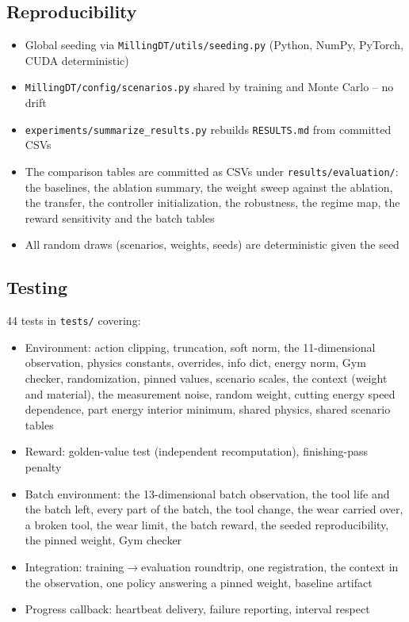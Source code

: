 \documentclass[11pt,a4paper]{article}
\begin{document}
\subsection{Reproducibility}
\begin{itemize}
    \item Global seeding via \texttt{MillingDT/utils/seeding.py} (Python, NumPy, PyTorch, CUDA deterministic)
    \item \texttt{MillingDT/config/scenarios.py} shared by training and Monte Carlo -- no drift
    \item \texttt{experiments/summarize\_results.py} rebuilds \texttt{RESULTS.md} from committed CSVs
    \item The comparison tables are committed as CSVs under \texttt{results/evaluation/}: the baselines, the ablation summary, the weight sweep against the ablation, the transfer, the controller initialization, the robustness, the regime map, the reward sensitivity and the batch tables
    \item All random draws (scenarios, weights, seeds) are deterministic given the seed
\end{itemize}

\subsection{Testing}
44 tests in \texttt{tests/} covering:
\begin{itemize}
    \item Environment: action clipping, truncation, soft norm, the 11-dimensional observation, physics constants, overrides, info dict, energy norm, Gym checker, randomization, pinned values, scenario scales, the context (weight and material), the measurement noise, random weight, cutting energy speed dependence, part energy interior minimum, shared physics, shared scenario tables
    \item Reward: golden-value test (independent recomputation), finishing-pass penalty
    \item Batch environment: the 13-dimensional batch observation, the tool life and the batch left, every part of the batch, the tool change, the wear carried over, a broken tool, the wear limit, the batch reward, the seeded reproducibility, the pinned weight, Gym checker
    \item Integration: training$\to$evaluation roundtrip, one registration, the context in the observation, one policy answering a pinned weight, baseline artifact
    \item Progress callback: heartbeat delivery, failure reporting, interval respect
\end{itemize}
\end{document}
